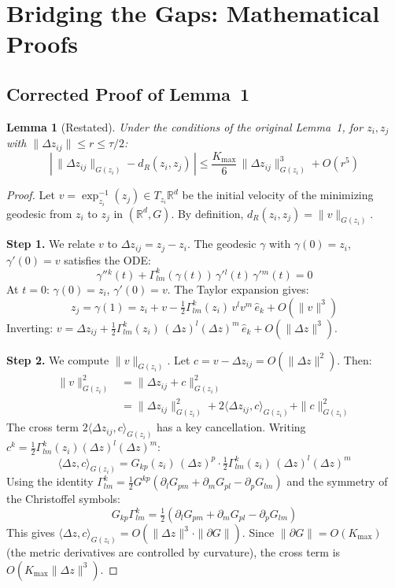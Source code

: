 \documentclass{article}
\newtheorem{lemma}{Lemma}
\begin{document}
\section{Bridging the Gaps: Mathematical Proofs}
\label{sec:bridges}

\subsection{Corrected Proof of Lemma~1}
\label{sec:bridge_lemma1}

\begin{proofbox}
\begin{lemma}[Restated]
Under the conditions of the original Lemma~1, for $z_i, z_j$ with
$\|\Delta z_{ij}\| \leq r \leq \tau/2$:
\[
  \left|\,\|\Delta z_{ij}\|_{G(z_i)} - d_R(z_i, z_j)\,\right|
  \leq \frac{K_{\max}}{6}\,\|\Delta z_{ij}\|^3_{G(z_i)} + O(r^5)
\]
\end{lemma}

\begin{proof}
Let $v = \exp_{z_i}^{-1}(z_j) \in T_{z_i}\mathbb{R}^d$ be the initial velocity
of the minimizing geodesic from $z_i$ to $z_j$ in $(\mathbb{R}^d, G)$. By
definition, $d_R(z_i, z_j) = \|v\|_{G(z_i)}$.

\textbf{Step 1.} We relate $v$ to $\Delta z_{ij} = z_j - z_i$. The geodesic
$\gamma$ with $\gamma(0) = z_i$, $\gamma'(0) = v$ satisfies the ODE:
\[
  \gamma''{}^k(t) + \Gamma^k_{lm}(\gamma(t))\,\gamma'{}^l(t)\,\gamma'{}^m(t) = 0
\]
At $t = 0$: $\gamma(0) = z_i$, $\gamma'(0) = v$. The Taylor expansion gives:
\[
  z_j = \gamma(1) = z_i + v - \tfrac{1}{2}\Gamma^k_{lm}(z_i)\,v^l v^m\,\hat{e}_k + O(\|v\|^3)
\]
Inverting: $v = \Delta z_{ij} + \tfrac{1}{2}\Gamma^k_{lm}(z_i)\,(\Delta z)^l(\Delta z)^m\,\hat{e}_k + O(\|\Delta z\|^3)$.

\textbf{Step 2.} We compute $\|v\|_{G(z_i)}$. Let $c = v - \Delta z_{ij} = O(\|\Delta z\|^2)$.
Then:
\begin{align*}
  \|v\|^2_{G(z_i)} &= \|\Delta z_{ij} + c\|^2_{G(z_i)} \\
  &= \|\Delta z_{ij}\|^2_{G(z_i)} + 2\langle \Delta z_{ij}, c\rangle_{G(z_i)} + \|c\|^2_{G(z_i)}
\end{align*}
The cross term $2\langle \Delta z_{ij}, c\rangle_{G(z_i)}$ has a key cancellation.
Writing $c^k = \tfrac{1}{2}\Gamma^k_{lm}(z_i)(\Delta z)^l(\Delta z)^m$:
\[
  \langle \Delta z, c\rangle_{G(z_i)} = G_{kp}(z_i)\,(\Delta z)^p \cdot
  \tfrac{1}{2}\Gamma^k_{lm}(z_i)\,(\Delta z)^l(\Delta z)^m
\]
Using the identity $\Gamma^k_{lm} = \tfrac{1}{2}G^{kp}(\partial_l G_{pm} + \partial_m G_{pl} - \partial_p G_{lm})$
and the symmetry of the Christoffel symbols:
\[
  G_{kp}\Gamma^k_{lm} = \tfrac{1}{2}(\partial_l G_{pm} + \partial_m G_{pl} - \partial_p G_{lm})
\]
This gives $\langle \Delta z, c\rangle_{G(z_i)} = O(\|\Delta z\|^3 \cdot \|\partial G\|)$.
Since $\|\partial G\| = O(K_{\max})$ (the metric derivatives are controlled by
curvature), the cross term is $O(K_{\max}\|\Delta z\|^3)$.


\end{proof}
\end{proofbox}
\end{document}
